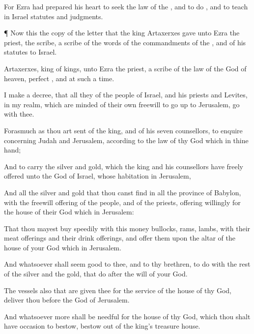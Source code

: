 {For
Ezra had
prepared his
heart to
seek the
law of the
{}, and to
do
{}, and to
teach in
Israel
statutes and
judgments.


\par }{\PP {}¶ Now this
{} the
copy of the
letter that the
king
Artaxerxes
gave unto
Ezra the
priest, the
scribe,
{} a
scribe of the
words of the
commandments of the
{}, and of his
statutes to
Israel.

Artaxerxes,
king of
kings, unto
Ezra the
priest, a
scribe of the
law of the
God of
heaven,
perfect
{}, and at such a
time.

I
make a
decree, that
all they
of the
people of
Israel, and
{} his
priests and
Levites, in my
realm, which are minded of their own
freewill to go
up to
Jerusalem,
go with
thee.

Forasmuch
as thou art
sent
of the
king, and of his
seven
counsellors, to
enquire
concerning
Judah and
Jerusalem, according to the
law of thy
God which
{} in thine
hand;

And to
carry the
silver and
gold, which the
king and his
counsellors have freely
offered unto the
God of
Israel,
whose
habitation
{} in
Jerusalem,

And
all the
silver and
gold that thou canst
find in
all the
province of
Babylon,
with the freewill
offering of the
people, and of the
priests, offering
willingly for the
house of their
God which
{} in
Jerusalem:

That thou mayest
buy
speedily with
this
money
bullocks,
rams,
lambs, with their meat
offerings and their drink
offerings, and
offer
them
upon the
altar of the
house of your
God which
{} in
Jerusalem.

And
whatsoever shall seem
good to thee, and
to thy
brethren, to
do with the
rest of the
silver and the
gold, that
do after the
will of your
God.

The
vessels also that are
given thee for the
service of the
house of thy
God,
{}
deliver thou
before the
God of
Jerusalem.

And whatsoever
more shall be
needful for the
house of thy
God, which thou shalt have
occasion to
bestow,
bestow
{} out
of the
king’s
treasure
house.

}
